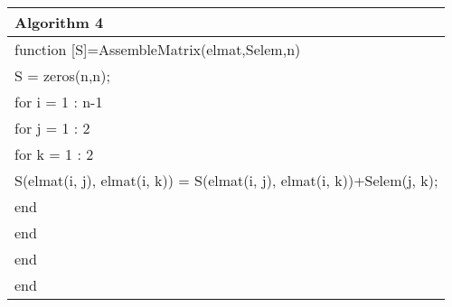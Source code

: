 \documentclass[a4paper,10pt]{report}
\begin{document}
\begin{enumerate}
\begin{table}
\begin{tabular}{ |l| } 
\hline
\textbf{Algorithm 4}\\
\hline
\hspace{0.5cm}function [S]=AssembleMatrix(elmat,Selem,n)\\
\hspace{0.5cm}S = zeros(n,n);\\
\hspace{0.5cm}for i = 1 : n-1\\
\hspace{1cm}    for j = 1 : 2\\
\hspace{1.5cm}    for k = 1 : 2\\
 \hspace{2cm}           S(elmat(i, j), elmat(i, k)) = S(elmat(i, j), elmat(i, k))+Selem(j, k);\\
 \hspace{1.5cm}       end\\
\hspace{1cm}end\\
\hspace{0.5cm}end\\
\hspace{0.5cm}end\\
\hline
\end{tabular}
\end{table}


\end{enumerate}
\end{document}

